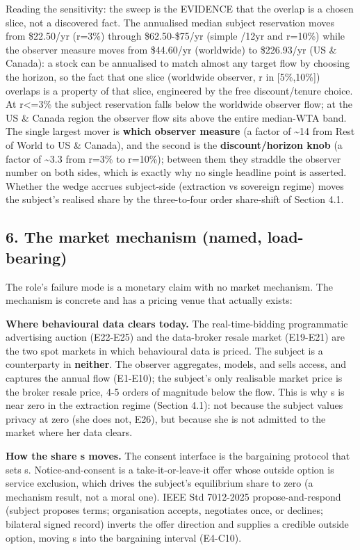\documentclass[
  11pt,
]{article}
\begin{document}
Reading the sensitivity: the sweep is the EVIDENCE that the overlap is a
chosen slice, not a discovered fact. The annualised median subject
reservation moves from \$22.50/yr (r=3\%) through \$62.50-\$75/yr
(simple /12yr and r=10\%) while the observer measure moves from
\$44.60/yr (worldwide) to \$226.93/yr (US \& Canada): a stock can be
annualised to match almost any target flow by choosing the horizon, so
the fact that one slice (worldwide observer, r in {[}5\%,10\%{]})
overlaps is a property of that slice, engineered by the free
discount/tenure choice. At r\textless=3\% the subject reservation falls
below the worldwide observer flow; at the US \& Canada region the
observer flow sits above the entire median-WTA band. The single largest
mover is \textbf{which observer measure} (a factor of \textasciitilde14
from Rest of World to US \& Canada), and the second is the
\textbf{discount/horizon knob} (a factor of \textasciitilde3.3 from
r=3\% to r=10\%); between them they straddle the observer number on both
sides, which is exactly why no single headline point is asserted.
Whether the wedge accrues subject-side (extraction vs sovereign regime)
moves the subject's realised share by the three-to-four order
share-shift of Section 4.1.

\subsection{6. The market mechanism (named,
load-bearing)}\label{the-market-mechanism-named-load-bearing}

The role's failure mode is a monetary claim with no market mechanism.
The mechanism is concrete and has a pricing venue that actually exists:

\textbf{Where behavioural data clears today.} The real-time-bidding
programmatic advertising auction (E22-E25) and the data-broker resale
market (E19-E21) are the two spot markets in which behavioural data is
priced. The subject is a counterparty in \textbf{neither}. The observer
aggregates, models, and sells access, and captures the annual flow
(E1-E10); the subject's only realisable market price is the broker
resale price, 4-5 orders of magnitude below the flow. This is why s is
near zero in the extraction regime (Section 4.1): not because the
subject values privacy at zero (she does not, E26), but because she is
not admitted to the market where her data clears.

\textbf{How the share s moves.} The consent interface is the bargaining
protocol that sets s. Notice-and-consent is a take-it-or-leave-it offer
whose outside option is service exclusion, which drives the subject's
equilibrium share to zero (a mechanism result, not a moral one). IEEE
Std 7012-2025 propose-and-respond (subject proposes terms; organisation
accepts, negotiates once, or declines; bilateral signed record) inverts
the offer direction and supplies a credible outside option, moving s
into the bargaining interval (E4-C10).
\end{document}
